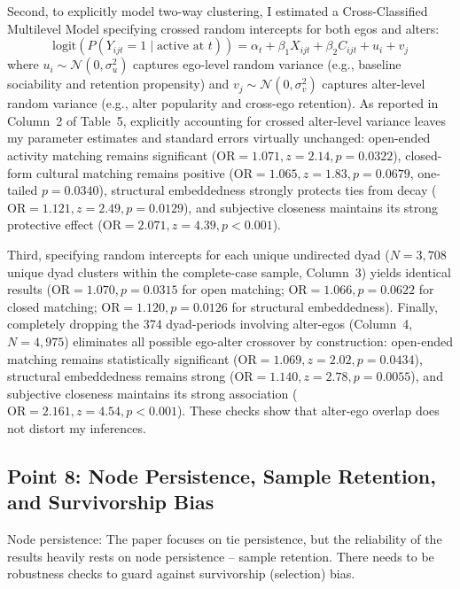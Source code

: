 \documentclass[11pt]{article}
\begin{document}
Second, to explicitly model two-way clustering, I estimated a Cross-Classified Multilevel Model specifying crossed random intercepts for both egos and alters:
\begin{equation*}
\text{logit}(P(Y_{ijt} = 1 \mid \text{active at } t)) = \alpha_t + \beta_1 X_{ijt} + \beta_2 C_{ijt} + u_i + v_j
\end{equation*}
where $u_i \sim \mathcal{N}(0, \sigma_u^2)$ captures ego-level random variance (e.g., baseline sociability and retention propensity) and $v_j \sim \mathcal{N}(0, \sigma_v^2)$ captures alter-level random variance (e.g., alter popularity and cross-ego retention). As reported in Column~2 of Table~5, explicitly accounting for crossed alter-level variance leaves my parameter estimates and standard errors virtually unchanged: open-ended activity matching remains significant ($\text{OR} = 1.071, z = 2.14, p = 0.0322$), closed-form cultural matching remains positive ($\text{OR} = 1.065, z = 1.83, p = 0.0679$, one-tailed $p = 0.0340$), structural embeddedness strongly protects ties from decay ($\text{OR} = 1.121, z = 2.49, p = 0.0129$), and subjective closeness maintains its strong protective effect ($\text{OR} = 2.071, z = 4.39, p < 0.001$).

Third, specifying random intercepts for each unique undirected dyad ($N = 3,708$ unique dyad clusters within the complete-case sample, Column~3) yields identical results ($\text{OR} = 1.070, p = 0.0315$ for open matching; $\text{OR} = 1.066, p = 0.0622$ for closed matching; $\text{OR} = 1.120, p = 0.0126$ for structural embeddedness). Finally, completely dropping the 374 dyad-periods involving alter-egos (Column~4, $N = 4,975$) eliminates all possible ego-alter crossover by construction: open-ended matching remains statistically significant ($\text{OR} = 1.069, z = 2.02, p = 0.0434$), structural embeddedness remains strong ($\text{OR} = 1.140, z = 2.78, p = 0.0055$), and subjective closeness maintains its strong association ($\text{OR} = 2.161, z = 4.54, p < 0.001$). These checks show that alter-ego overlap does not distort my inferences.

\subsection*{Point 8: Node Persistence, Sample Retention, and Survivorship Bias}

\begin{reviewercomment}
Node persistence: The paper focuses on tie persistence, but the reliability of the results heavily rests on node persistence -- sample retention. There needs to be robustness checks to guard against survivorship (selection) bias.
\end{reviewercomment}
\end{document}
